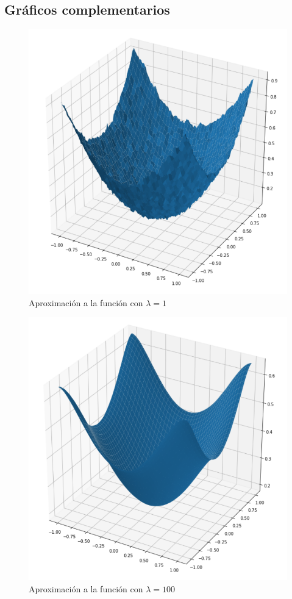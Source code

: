 \documentclass[conference]{IEEEtran}
\begin{document}
\subsection{Gráficos complementarios}

\begin{figure}[htbp]
    \centerline{\includegraphics[scale=0.25]{r1.png}}
    \caption{Aproximación a la función con $\lambda=1$}
    \label{r1}
\end{figure}

\begin{figure}[htbp]
    \centerline{\includegraphics[scale=0.25]{r100.png}}
    \caption{Aproximación a la función con $\lambda=100$}
    \label{r100}
\end{figure}
\end{document}

